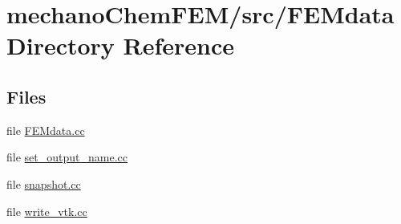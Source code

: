 \section{mechano\+Chem\+F\+E\+M/src/\+F\+E\+Mdata Directory Reference}
\label{dir_2dd72f5f1bfd972b5ee926207c36fff5}
\subsection*{Files}
\begin{DoxyCompactItemize}
\item 
file \mbox{\hyperlink{_f_e_mdata_8cc}{F\+E\+Mdata.\+cc}}
\item 
file \mbox{\hyperlink{set__output__name_8cc}{set\+\_\+output\+\_\+name.\+cc}}
\item 
file \mbox{\hyperlink{snapshot_8cc}{snapshot.\+cc}}
\item 
file \mbox{\hyperlink{write__vtk_8cc}{write\+\_\+vtk.\+cc}}
\end{DoxyCompactItemize}
